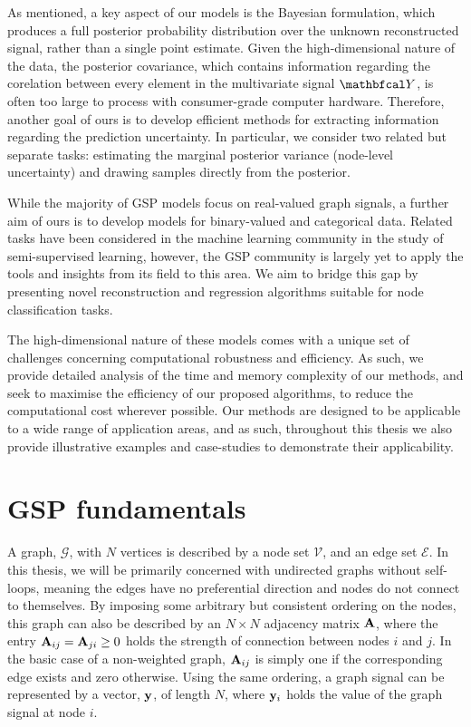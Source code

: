 As mentioned, a key aspect of our models is the Bayesian formulation, which produces a full posterior probability distribution over the unknown reconstructed signal, rather than a single point estimate. Given the high-dimensional nature of the data, the posterior covariance, which contains information regarding the corelation between every element in the multivariate signal $\Yt$, is often too large to process with consumer-grade computer hardware. Therefore, another goal of ours is to develop efficient methods for extracting information regarding the prediction uncertainty. In particular, we consider two related but separate tasks: estimating the marginal posterior variance (node-level uncertainty) and drawing samples directly from the posterior. 


While the majority of GSP models focus on real-valued graph signals, a further aim of ours is to develop models for binary-valued and categorical data. Related tasks have been considered in the machine learning community in the study of semi-supervised learning, however, the GSP community is largely yet to apply the tools and insights from its field to this area. We aim to bridge this gap by presenting novel reconstruction and regression algorithms suitable for node classification tasks. 


The high-dimensional nature of these models comes with a unique set of challenges concerning computational robustness and efficiency. As such, we provide detailed analysis of the time and memory complexity of our methods, and seek to maximise the efficiency of our proposed algorithms, to reduce the computational cost wherever possible. Our methods are designed to be applicable to a wide range of application areas, and as such, throughout this thesis we also provide illustrative examples and case-studies to demonstrate their applicability. 

\newpage 


\section{GSP fundamentals}

\label{sec:fundamentals}

A graph, $\mathcal{G}$, with $N$ vertices is described by a node set $\mathcal{V}$, and an edge set $\mathcal{E}$. In this thesis, we will be primarily concerned with undirected graphs without self-loops, meaning the edges have no preferential direction and nodes do not connect to themselves. By imposing some arbitrary but consistent ordering on the nodes, this graph can also be described by an $N \times N$ adjacency matrix $\mathbf{A}$, where the entry $\mathbf{A}_{ij} = \mathbf{A}_{ji} \geq 0$ holds the strength of connection between nodes $i$ and $j$. In the basic case of a non-weighted graph, $\mathbf{A}_{ij}$ is simply one if the corresponding edge exists and zero otherwise. Using the same ordering, a graph signal can be represented by a vector, $\mathbf{y}$, of length $N$, where $\mathbf{y}_i$ holds the value of the graph signal at node $i$. 

